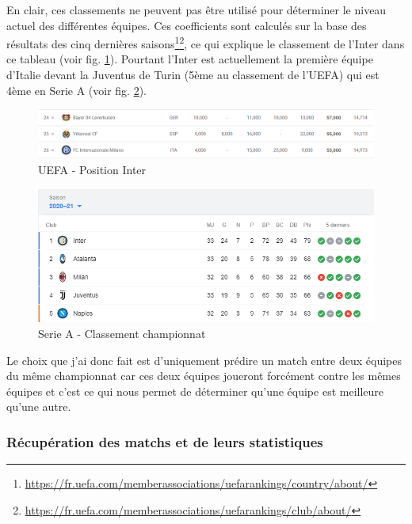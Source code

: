 \documentclass[a4paper,14pt]{extarticle}
\begin{document}
{En clair, ces classements ne peuvent pas être utilisé pour déterminer le niveau actuel des différentes équipes. Ces coefficients sont calculés sur la base des résultats des cinq dernières saisons\footnote{\url{https://fr.uefa.com/memberassociations/uefarankings/country/about/}}\footnote{\url{https://fr.uefa.com/memberassociations/uefarankings/club/about/}}, ce qui explique le classement de l'Inter dans ce tableau (voir fig. \ref{fig:classementInterUEFA}).  Pourtant l'Inter est actuellement la première équipe d'Italie devant la Juventus de Turin (5ème au classement de l'UEFA) qui est 4ème en Serie A (voir fig. \ref{fig:classementSerieA}).

\begin{figure}[htp]
    \centering
    \includegraphics[width=16cm]{../img/classementInterUEFA.png}
    \caption{UEFA - Position Inter}
    \label{fig:classementInterUEFA}
\end{figure}

\begin{figure}[htp]
    \centering
    \includegraphics[width=16cm]{../img/classementSerieA.png}
    \caption{Serie A - Classement championnat}
    \label{fig:classementSerieA}
\end{figure}

Le choix que j'ai donc fait est d'uniquement prédire un match entre deux équipes du même championnat car ces deux équipes joueront forcément contre les mêmes équipes et c'est ce qui nous permet de déterminer qu'une équipe est meilleure qu'une autre.

\subsubsection{Récupération des matchs et de leurs statistiques}
\label{recupMatchStats}

}
\end{document}
